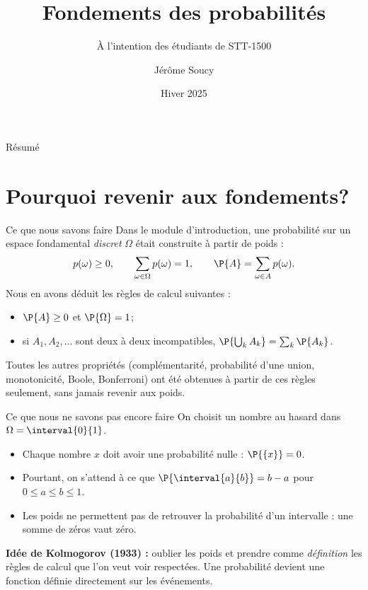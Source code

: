 \documentclass[nuit,charter,pied]{BeamerJS}
\title{Fondements des probabilités}
\subtitle{À l'intention des étudiants de STT-1500}
\institute{Université Laval}
\author{Jérôme Soucy}
\date{Hiver 2025}
\begin{document}
\begin{frame}
	\titlepage
\end{frame}
\begin{frame}{Résumé}
\tableofcontents
\end{frame}

\section{Pourquoi revenir aux fondements?}

\begin{frame}[t]{Ce que nous savons faire}
\pause
	Dans le module d'introduction, une probabilité sur un espace fondamental \emph{discret} \(\Omega\) était construite à partir de poids :
	\[p(\omega)\geq 0,\qquad \sum_{\omega\in\Omega}p(\omega)=1,\qquad \P{A}=\sum_{\omega\in A}p(\omega).\]
	\pause
	Nous en avons déduit les règles de calcul suivantes :
	\begin{itemize}
		\item \(\P{A}\geq 0\) et \(\P{\Omega}=1\);\pause
		\item si \(A_1,A_2,\ldots\) sont deux à deux incompatibles, \(\P{\bigcup_{k}A_k}=\sum_{k}\P{A_k}\).
	\end{itemize}
	\pause
	\begin{lumiere}
		Toutes les autres propriétés (complémentarité, probabilité d'une union, monotonicité, Boole, Bonferroni) ont été obtenues à partir de ces règles seulement, sans jamais revenir aux poids.
	\end{lumiere}
\end{frame}

\begin{frame}[t]{Ce que nous ne savons pas encore faire}
\pause
	On choisit un nombre au hasard dans \(\Omega=\interval{0}{1}\).
	\pause
	\begin{itemize}
		\item Chaque nombre \(x\) doit avoir une probabilité nulle : \(\P{\{x\}}=0\).\pause
		\item Pourtant, on s'attend à ce que \(\P{\interval{a}{b}}=b-a\) pour \(0\leq a\leq b\leq 1\).\pause
		\item Les poids ne permettent pas de retrouver la probabilité d'un intervalle : une somme de zéros vaut zéro.
	\end{itemize}
	\pause
	\begin{lumiere}
		\textbf{Idée de Kolmogorov (1933) :} oublier les poids et prendre comme \emph{définition} les règles de calcul que l'on veut voir respectées. Une probabilité devient une fonction définie directement sur les événements.
	\end{lumiere}
\end{frame}
\end{document}
